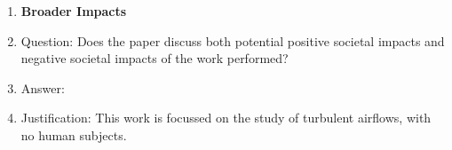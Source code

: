 \documentclass{article}
\begin{document}
\begin{enumerate}
\item {\bf Broader Impacts}
    \item[] Question: Does the paper discuss both potential positive societal impacts and negative societal impacts of the work performed?
    \item[] Answer: \answerNA{} %
    \item[] Justification: This work is focussed on the study of turbulent airflows, with no human subjects.
    

\end{enumerate}
\end{document}
